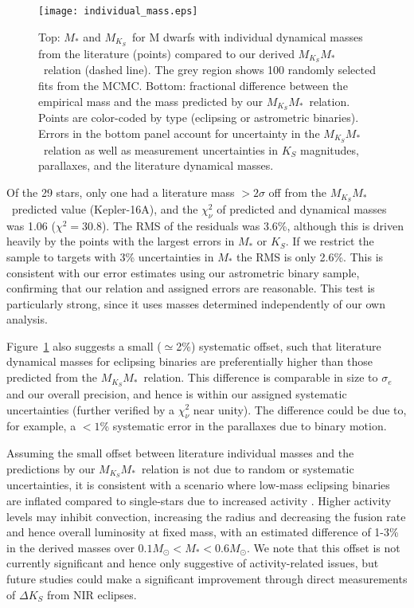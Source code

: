 \documentclass[twocolumn]{aastex62}
\newcommand{\mks}{$M_{K_S}$}
\newcommand{\mmk}{$M_{K_S}$\textendash$M_*$}
\begin{document}
\begin{figure}[th]
\begin{center}
\texttt{[image: individual\_mass.eps]}
\caption{Top: $M_*$ and \mks\ for M dwarfs with individual dynamical masses from the literature (points) compared to our derived \mmk\ relation (dashed line). The grey region shows 100 randomly selected fits from the MCMC. Bottom: fractional difference between the empirical mass and the mass predicted by our \mmk\ relation. Points are color-coded by type (eclipsing or astrometric binaries). Errors in the bottom panel account for uncertainty in the \mmk\ relation as well as measurement uncertainties in $K_S$ magnitudes, parallaxes, and the literature dynamical masses. }
\label{fig:ind}
\end{center}
\end{figure}

Of the 29 stars, only one had a literature mass $>2\sigma$ off from the \mmk\ predicted value (Kepler-16A), and the $\chi^2_\nu$ of predicted and dynamical masses was 1.06 ($\chi^2=30.8$). The RMS of the residuals was 3.6\%, although this is driven heavily by the points with the largest errors in $M_*$ or $K_S$. If we restrict the sample to targets with 3\% uncertainties in $M_*$ the RMS is only 2.6\%. This is consistent with our error estimates using our astrometric binary sample, confirming that our relation and assigned errors are reasonable. This test is particularly strong, since it uses masses determined independently of our own analysis.

Figure~\ref{fig:ind} also suggests a small ($\simeq$2\%) systematic offset, such that literature dynamical masses for eclipsing binaries are preferentially higher than those predicted from the \mmk\ relation. This difference is comparable in size to $\sigma_e$ and our overall precision, and hence is within our assigned systematic uncertainties (further verified by a $\chi^2_\nu$ near unity). The difference could be due to, for example, a $<1$\% systematic error in the parallaxes due to binary motion. 

Assuming the small offset between literature individual masses and the predictions by our \mmk\ relation is not due to random or systematic uncertainties, it is consistent with a scenario where low-mass eclipsing binaries are inflated compared to single-stars due to increased activity \citep[e.g.,][]{MacDonald2012, Feiden2013,Feiden2014a,Somers2017}. Higher activity levels may inhibit convection, increasing the radius and decreasing the fusion rate and hence overall luminosity at fixed mass, with an estimated difference of 1-3\% in the derived masses over $0.1M_\odot<M_*<0.6M_\odot$. We note that this offset is not currently significant and hence only suggestive of activity-related issues, but future studies could make a significant improvement through direct measurements of $\Delta K_S$ from NIR eclipses. 
\end{document}
